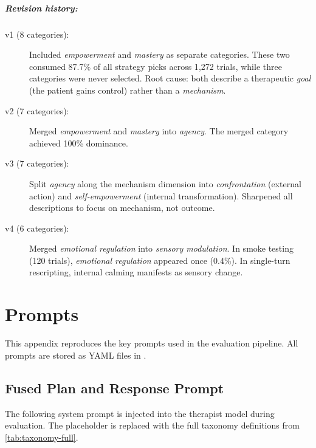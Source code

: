 \paragraph{Revision history:}
\begin{description}
  \item[v1 (8 categories):] Included \emph{empowerment} and
    \emph{mastery} as separate categories. These two consumed 87.7\% of
    all strategy picks across 1{,}272 trials, while three categories were
    never selected. Root cause: both describe a therapeutic \emph{goal}
    (the patient gains control) rather than a \emph{mechanism}.
  \item[v2 (7 categories):] Merged \emph{empowerment} and
    \emph{mastery} into \emph{agency}. The merged category achieved
    100\% dominance.
  \item[v3 (7 categories):] Split \emph{agency} along the mechanism
    dimension into \emph{confrontation} (external action) and
    \emph{self-empowerment} (internal transformation). Sharpened all
    descriptions to focus on mechanism, not outcome.
  \item[v4 (6 categories):] Merged \emph{emotional regulation} into
    \emph{sensory modulation}. In smoke testing (120 trials),
    \emph{emotional regulation} appeared once (0.4\%). In single-turn
    rescripting, internal calming manifests as sensory change.
\end{description}


\chapter{Prompts}
\label{app:prompts}

This appendix reproduces the key prompts used in the evaluation pipeline.
All prompts are stored as YAML files in .

\section{Fused Plan and Response Prompt}
\label{app:fused-prompt}

The following system prompt is injected into the therapist model during
evaluation. The  placeholder is replaced
with the full taxonomy definitions from \autoref{tab:taxonomy-full}.

